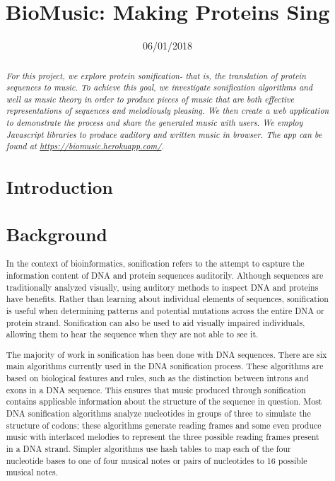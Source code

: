 \documentclass[11pt,a4paper]{article}
\title{BioMusic: Making Proteins Sing}
\date{06/01/2018}
\begin{document}
\maketitle
\begin{abstract}
  \textit{
  For this project, we explore protein sonification- that is, the translation of protein sequences to music. To achieve this goal, we investigate sonification algorithms and well as music theory in order to produce pieces of music that are both effective representations of sequences and melodiously pleasing. We then create a web application to demonstrate the process and share the generated music with users. We employ Javascript libraries to produce auditory and written music in browser. The app can be found at \underline{https://biomusic.herokuapp.com/}.
  }

\section{Introduction}



\section{Background}

In the context of bioinformatics, sonification refers to the attempt to capture the information content of DNA and protein sequences auditorily. Although sequences are traditionally analyzed visually, using auditory methods to inspect DNA and proteins have benefits. Rather than learning about individual elements of sequences, sonification is useful when determining patterns and potential mutations across the entire DNA or protein strand. Sonification can also be used to aid visually impaired individuals, allowing them to hear the sequence when they are not able to see it. 

The majority of work in sonification has been done with DNA sequences. There are six main algorithms currently used in the DNA sonification process. These algorithms are based on biological features and rules, such as the distinction between introns and exons in a DNA sequence. This ensures that music produced through sonification contains applicable information about the structure of the sequence in question.  Most DNA sonification algorithms analyze nucleotides in groups of three to simulate the structure of codons; these algorithms generate reading frames and some even produce music with interlaced melodies to represent the three possible reading frames present in a DNA strand. Simpler algorithms use hash tables to map each of the four nucleotide bases to one of four musical notes or pairs of nucleotides to 16 possible musical notes. 


\end{abstract}
\end{document}
